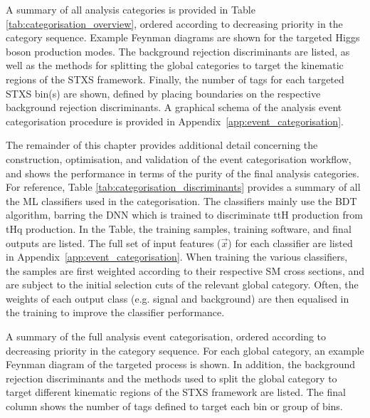 A summary of all analysis categories is provided in Table \ref{tab:categorisation_overview}, ordered according to decreasing priority in the category sequence. Example Feynman diagrams are shown for the targeted Higgs boson production modes. The background rejection discriminants are listed, as well as the methods for splitting the global categories to target the kinematic regions of the STXS framework. Finally, the number of tags for each targeted STXS bin(s) are shown, defined by placing boundaries on the respective background rejection discriminants. A graphical schema of the analysis event categorisation procedure is provided in Appendix~\ref{app:event_categorisation}.

The remainder of this chapter provides additional detail concerning the construction, optimisation, and validation of the event categorisation workflow, and shows the performance in terms of the purity of the final analysis categories. For reference, Table \ref{tab:categorisation_discriminants} provides a summary of all the ML classifiers used in the categorisation. The classifiers mainly use the BDT algorithm, barring the DNN which is trained to discriminate ttH production from tHq production. In the Table, the training samples, training software, and final outputs are listed. The full set of input features ($\vec{x}$) for each classifier are listed in Appendix~\ref{app:event_categorisation}. When training the various classifiers, the samples are first weighted according to their respective SM cross sections, and are subject to the initial selection cuts of the relevant global category. Often, the weights of each output class (e.g. signal and background) are then equalised in the training to improve the classifier performance.

\begin{table}[htb]
    \caption[Categorisation overview]{A summary of the full analysis event categorisation, ordered according to decreasing priority in the category sequence. For each global category, an example Feynman diagram of the targeted process is shown. In addition, the background rejection discriminants and the methods used to split the global category to target different kinematic regions of the STXS framework are listed. The final column shows the number of tags defined to target each bin or group of bins.}
    \label{tab:categorisation_overview}
    \centering
    \tiny
    \renewcommand{\arraystretch}{1.3}
    \setlength{\tabcolsep}{2pt}
    \hspace*{-3cm}
    
    \hspace*{-3cm}
\end{table}

